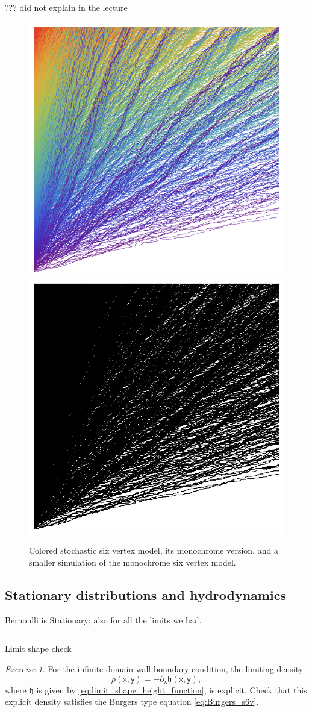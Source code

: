 \documentclass[letterpaper,11pt,oneside,reqno]{article}
\numberwithin{equation}{section}
\theoremstyle{definition}
\theoremstyle{remark}
\newtheorem{exercise}{Exercise}[section]
\begin{document}
??? did not explain in the lecture

\begin{figure}[htpb]
	\centering
	\includegraphics[width=.3\textwidth]{./images/CS6V.png}
	\quad
	\includegraphics[width=.3\textwidth]{./images/S6V.png}
	\quad
	\caption{Colored stochastic six vertex model, its monochrome version,
	and a smaller simulation of the monochrome six vertex model.}
	\label{fig:CS6V}
\end{figure}




\subsection{Stationary distributions and hydrodynamics}
\label{sub:hydrodynamic_analysis}




Bernoulli is Stationary; also for all the limits we had.

\begin{equation}
	\label{eq:Burgers_s6v}
\end{equation}

Limit shape check


\begin{exercise}
	For the infinite domain wall boundary condition,
	the limiting 
	density
	\begin{equation*}
		\rho(\mathsf{x},\mathsf{y})=-\partial_\mathsf{x} \mathfrak{h}(\mathsf{x},\mathsf{y}),
	\end{equation*}
	where $\mathfrak{h}$ is 
	given by \eqref{eq:limit_shape_height_function},
	is explicit. Check that this explicit density
	satisfies the Burgers type equation
	\eqref{eq:Burgers_s6v}.
\end{exercise}
\end{document}

